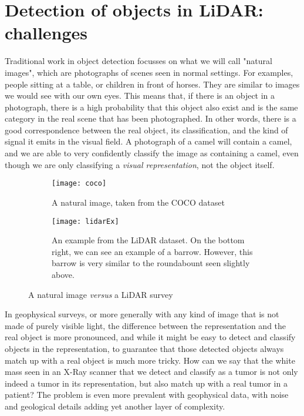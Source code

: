 \section{Detection of objects in LiDAR: challenges}%
Traditional work in object detection focusses on what we will call "natural images", which are photographs of scenes seen in normal settings. For examples, people sitting at a table, or children in front of horses. They are similar to images we would see with our own eyes. This means that, if there is an object in a photograph, there is a high probability that this object also exist and is the same category in the real scene that has been photographed. In other words, there is a good correspondence between the real object, its classification, and the kind of signal it emits in the visual field. A photograph of a camel will contain a camel, and we are able to very confidently classify the image as containing a camel, even though we are only classifying a \textit{visual representation}, not the object itself.

\begin{figure}[h]
	\begin{subfigure}[t]{.5\textwidth}
  \centering
  \texttt{[image: coco]}  
	\caption{A natural image, taken from the COCO\cite{msCOCO} dataset}
  \label{fig:cocoEx}
\end{subfigure}
	\begin{subfigure}[t]{.5\textwidth}
  \centering
  \texttt{[image: lidarEx]}  
  \caption{An example from the LiDAR dataset. On the bottom right, we can see an example of a barrow. However, this barrow is very similar to the roundabount seen slightly above.}
  \label{fig:lidarEx}
\end{subfigure}
	\caption{A natural image \textit{versus} a LiDAR survey}
\label{fig:cocovslidar}
\end{figure}

In geophysical surveys, or more generally with any kind of image that is not made of purely visible light, the difference between the representation and the real object is more pronounced, and while it might be easy to detect and classify objects in the representation, to guarantee that those detected objects always match up with a real object is much more tricky. How can we say that the white mass seen in an X-Ray scanner that we detect and classify as a tumor is not only indeed a tumor in its representation, but also match up with a real tumor in a patient? The problem is even more prevalent with geophysical data, with noise and geological details adding yet another layer of complexity.

